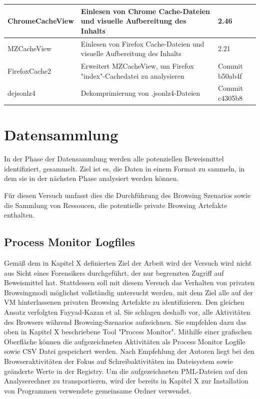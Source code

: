\begin{table}[]
{\begin{tabular}{|l|l|l|}
ChromeCacheView                         & Einlesen von Chrome Cache-Dateien und visuelle Aufbereitung des Inhalts          & 2.46                                  \\ \hline
MZCacheView                             & Einlesen von Firefox Cache-Dateien und visuelle Aufbereitung des Inhalts         & 2.21                                  \\ \hline
FirefoxCache2                           & Erweitert MZCacheView, um Firefox "index"-Cachedatei zu analysieren              & Commit b50ab4f                        \\ \hline
dejsonlz4                               & Dekomprimierung von .jsonlz4-Dateien                                             & Commit c4305b8                        \\ \hline
\end{tabular}
}
\end{table}



\section{Datensammlung}


In der Phase der Datensammlung werden alle potenziellen Beweismittel identifiziert, gesammelt. Ziel ist es, die Daten in einem Format zu sammeln, in dem sie in der nächsten Phase analysiert werden können. \cite{Izzati.2022}

Für diesen Versuch umfasst dies die Durchführung des Browsing Szenarios sowie die Sammlung von Ressoucen, die potentielle private Browsing Artefakte enthalten.

\subsection*{Process Monitor Logfiles}
Gemäß dem in Kapitel X definierten Ziel der Arbeit wird der Versuch wird nicht aus Sicht eines Forensikers durchgeführt, der nur begrenzten Zugriff auf Beweismittel hat. 
Stattdessen soll mit diesem Versuch das Verhalten von privaten Browsingmodi möglichst vollständig untersucht werden, mit dem Ziel alle auf der VM hinterlassenen privaten Browsing Artefakte zu identifizieren.
Den gleichen Ansatz verfolgten Fayyad-Kazan et al. \cite{Fayyad.2021} Sie schlagen deshalb vor, alle Aktivitäten des Browsers während Browsing-Szenarios aufzeichnen.
Sie empfehlen dazu das oben in Kapitel X beschriebene Tool "Process Monitor".
Mithilfe einer grafischen Oberfläche können die aufgezeichneten Aktivitäten als Process Monitor Logfile sowie CSV Datei gespeichert werden.
Nach Empfehlung der Autoren liegt bei den Browseraktivitäten der Fokus auf Schreibaktivitäten im Dateisystem sowie geänderte Werte in der Registry. \cite{Fayyad.2021, Rochmadi.2017}
Um die aufgezeichneten PML-Dateien auf den Analyserechner zu transportieren, wird der bereits in Kapitel X zur Installation von Programmen verwendete gemeinsame Ordner verwendet.

